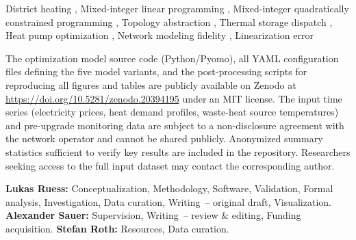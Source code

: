 \documentclass[review,3p]{elsarticle}
\newcommand{\Lplus}{\mathrm{L3}^{+}}
\newcommand{\Lnl}{\mathrm{L3}^{\mathrm{NL}}}
\begin{document}
\begin{frontmatter}
\begin{abstract}
Results establish a clear effect hierarchy: the L1$\to$L2 transition
(physics inclusion) causes 12\,\% cost underestimation and
63\,t\,/year; the full L1$\to$L3 gap reaches
74\,t\,/year; L3$\to\Lplus$ (extended physics) adds
$0.11$\,\% through pumping and transport delay; and the
$\Lplus\to\Lnl$ linearization error is ${\leq}\,0.35$\,\%,
validating MILP for planning purposes. These findings yield
actionable selection criteria linking pipe length, demand
heterogeneity, and transport delay to the minimum warranted model
level.
\end{abstract}

\begin{keyword}
  District heating \sep
  Mixed-integer linear programming \sep
  Mixed-integer quadratically constrained programming \sep
  Topology abstraction \sep
  Thermal storage dispatch \sep
  Heat pump optimization \sep
  Network modeling fidelity \sep
  Linearization error
\end{keyword}

\begin{dataavailability}
The optimization model source code (Python/Pyomo), all YAML
configuration files defining the five model variants, and the
post-processing scripts for reproducing all figures and tables are
publicly available on Zenodo at
\url{https://doi.org/10.5281/zenodo.20394195} under an MIT license.
The input time series (electricity prices, heat demand profiles,
waste-heat source temperatures) and pre-upgrade monitoring data are
subject to a non-disclosure agreement with the network operator and
cannot be shared publicly. Anonymized summary statistics sufficient
to verify key results are included in the repository. Researchers
seeking access to the full input dataset may contact the
corresponding author.
\end{dataavailability}

\begin{credit}
\textbf{Lukas Ruess:} Conceptualization, Methodology, Software,
Validation, Formal analysis, Investigation, Data curation,
Writing~-- original draft, Visualization.
\textbf{Alexander Sauer:} Supervision, Writing~-- review \& editing,
Funding acquisition.
\textbf{Stefan Roth:} Resources, Data curation.
\end{credit}

\end{frontmatter}

\linenumbers

\end{document}
